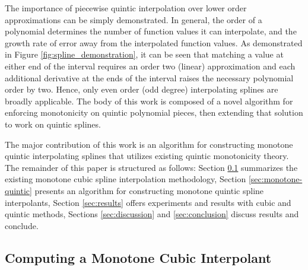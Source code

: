 \documentclass{scspaperproc}
\theoremstyle{scsthe}
\begin{document}
The importance of piecewise quintic interpolation over lower order approximations can be simply demonstrated. In general, the order of a polynomial determines the number of function values it can interpolate, and the growth rate of error away from the interpolated function values. As demonstrated in Figure \ref{fig:spline_demonstration}, it can be seen that matching a value at either end of the interval requires an order two (linear) approximation and each additional derivative at the ends of the interval raises the necessary polynomial order by two. Hence, only even order (odd degree) interpolating splines are broadly applicable. The body of this work is composed of a novel algorithm for enforcing monotonicity on quintic polynomial pieces, then extending that solution to work on quintic splines.


The major contribution of this work is an algorithm for constructing monotone quintic interpolating splines that utilizes existing quintic monotonicity theory. The remainder of this paper is structured as follows: Section \ref{sec:monotone-cubic} summarizes the existing monotone cubic spline interpolation methodology, Section \ref{sec:monotone-quintic} presents an algorithm for constructing monotone quintic spline interpolants, Section \ref{sec:results} offers experiments and results with cubic and quintic methods, Sections \ref{sec:discussion} and \ref{sec:conclusion} discuss results and conclude.


\subsection{Computing a Monotone Cubic Interpolant}
\label{sec:monotone-cubic}
\end{document}
